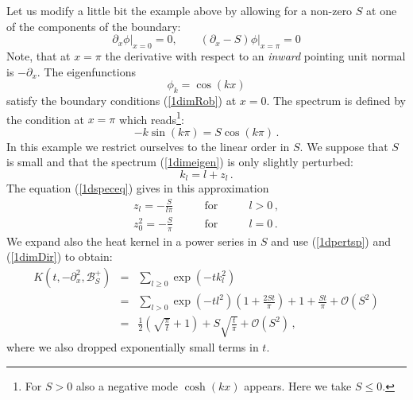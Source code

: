 Let us modify a little bit the example above by allowing for a non-zero
$S$ at one of the components of the boundary:
\begin{equation}
\partial_x\phi \vert_{x=0}=0,\qquad
(\partial_x-S)\phi \vert_{x=\pi}=0 \label{1dimRob}
\end{equation}
Note, that at $x=\pi$ the derivative with respect to an {\it inward}
pointing unit normal is $-\partial_x$. The eigenfunctions  
\begin{equation}
\phi_k=\cos (kx) \label{1derob}
\end{equation}
satisfy the boundary conditions (\ref{1dimRob}) at $x=0$.
The spectrum is defined by the condition at $x=\pi$ which reads\footnote{
For $S>0$ also a negative mode $\cosh (kx)$ appears. Here we take
$S\le 0$.}:
\begin{equation}
-k \sin (k\pi)=S\cos (k\pi) \,.\label{1dspeceq}
\end{equation}
In this example we restrict ourselves to the linear order in $S$.
We suppose that $S$ is small and that the spectrum (\ref{1dimeigen})
is only slightly
perturbed: 
\begin{equation}
k_l=l+z_l \,.\label{1dpertspec} 
\end{equation}
The equation (\ref{1dspeceq}) gives in this approximation
\begin{eqnarray}
z_l=-\frac{S}{l\pi}&\qquad\mbox{for}\qquad& l>0\,,\nonumber \\
z_0^2=-\frac{S}{\pi}&\qquad\mbox{for}\qquad& l=0\,.\label{1dpertsp}
\end{eqnarray}
We expand also the heat kernel in a power series in $S$ and use
(\ref{1dpertsp}) and (\ref{1dimDir}) to obtain:
\begin{eqnarray}
K(t,-\partial_x^2,\mathcal{B}^+_S)&=&\sum_{l\ge 0} \exp (-tk_l^2)
\nonumber\\
&=&\sum_{l> 0} \exp (-tl^2) \left( 1+\frac{2St}{\pi} \right)
+1+\frac{St}{\pi} +\mathcal{O}(S^2)\nonumber\\
&=&\frac 12 \left( \sqrt{\frac{\pi}t} +1 \right) +
S\sqrt{\frac t\pi}  +\mathcal{O}(S^2) \,,\label{1dlinS}
\end{eqnarray}
where we also dropped exponentially small terms in $t$.

